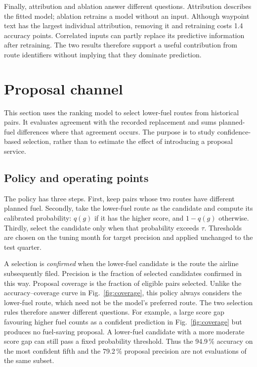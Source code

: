 \documentclass[preprint,authoryear,12pt]{elsarticle}
\begin{document}
Finally, attribution and ablation answer different questions.
Attribution describes the fitted model; ablation retrains a model
without an input. Although waypoint text has the largest individual
attribution, removing it and retraining costs 1.4 accuracy points.
Correlated inputs can partly replace its predictive information after
retraining. The two results therefore support a useful contribution
from route identifiers without implying that they dominate prediction.

\section{Proposal channel}
\label{sec:channel}

This section uses the ranking model to select lower-fuel routes from
historical pairs. It evaluates agreement with the recorded replacement
and sums planned-fuel differences where that agreement occurs. The
purpose is to study confidence-based selection, rather than to estimate
the effect of introducing a proposal service.

\subsection{Policy and operating points}

The policy has three steps. First, keep pairs whose two routes have
different planned fuel. Secondly, take the lower-fuel route as the
candidate and compute its calibrated probability: $q(g)$ if it has the
higher score, and $1-q(g)$ otherwise. Thirdly, select the candidate
only when that probability exceeds $\tau$. Thresholds are chosen on
the tuning month for target precision and applied unchanged to the test
quarter.

A selection is \emph{confirmed} when the lower-fuel candidate is the
route the airline subsequently filed. Precision is the fraction of
selected candidates confirmed in this way. Proposal coverage is the
fraction of eligible pairs selected. Unlike the accuracy--coverage
curve in Fig.~\ref{fig:coverage}, this policy always considers the
lower-fuel route, which need not be the model's preferred route.
The two selection rules therefore answer different questions. For
example, a large score gap favouring higher fuel counts as a confident
prediction in Fig.~\ref{fig:coverage} but produces no fuel-saving
proposal. A lower-fuel candidate with a more moderate score gap can
still pass a fixed probability threshold. Thus the 94.9\,\% accuracy
on the most confident fifth and the 79.2\,\% proposal precision are
not evaluations of the same subset.
\end{document}
